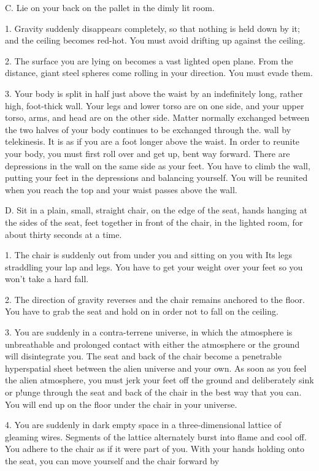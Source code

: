 \documentclass[10pt,twoside]{memoir}
\begin{document}
\begin{enumerate}
{\begin{enumerate}
\begin{sysrules}
\begin{sysrules}
\begin{sysrules}
\begin{sysrules}
C. Lie on your back on the pallet in the dimly lit room. 

1. Gravity suddenly disappears completely, so that nothing is held down by 
it; and the ceiling becomes red-hot. You must avoid drifting up against the 
ceiling. 

2. The surface you are lying on becomes a vast lighted open plane. From the 
distance, giant steel spheres come rolling in your direction. You must evade 
them. 

3. Your body is split in half just above the waist by an indefinitely long, 
rather high, foot-thick wall. Your legs and lower torso are on one side, and 
your upper torso, arms, and head are on the other side. Matter normally 
exchanged between the two halves of your body continues to be exchanged 
through the. wall by telekinesis. It is as if you are a foot longer above the 
waist. In order to reunite your body, you must first roll over and get up, 
bent way forward. There are depressions in the wall on the same side as your 
feet. You have to climb the wall, putting your feet in the depressions and 
balancing yourself. You will be reunited when you reach the top and your 
waist passes above the wall. 

D. Sit in a plain, small, straight chair, on the edge of the seat, hands 
hanging at the sides of the seat, feet together in front of the chair, in the 
lighted room, for about thirty seconds at a time. 

1. The chair is suddenly out from under you and sitting on you with Its legs 
straddling your lap and legs. You have to get your weight over your feet so 
you won't take a hard fall. 

2. The direction of gravity reverses and the chair remains anchored to the 
floor. You have to grab the seat and hold on in order not to fall on the 
ceiling. 

3. You are suddenly in a contra-terrene universe, in which the atmosphere is 
unbreathable and prolonged contact with either the atmosphere or the 
ground will disintegrate you. The seat and back of the chair become a 
penetrable hyperspatial sheet between the alien universe and your own. As 
soon as you feel the alien atmosphere, you must jerk your feet off the 
ground and deliberately sink or p!unge through the seat and back of the chair 
in the best way that you can. You will end up on the floor under the chair in 
your universe. 

4. You are suddenly in dark empty space in a three-dimensional lattice of 
gleaming wires. Segments of the lattice alternately burst into flame and cool 
off. You adhere to the chair as if it were part of you. With your hands 
holding onto the seat, you can move yourself and the chair forward by 



\end{sysrules}
\end{sysrules}
\end{sysrules}
\end{sysrules}
\end{enumerate}}
\end{enumerate}
\end{document}
